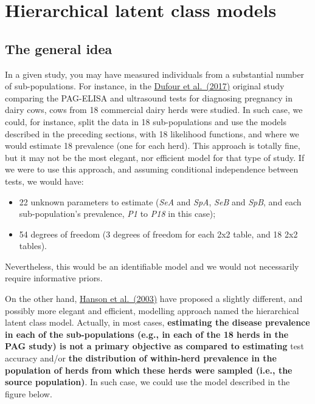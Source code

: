 \documentclass[
]{book}
\providecommand{\tightlist}{%
  \setlength{\itemsep}{0pt}\setlength{\parskip}{0pt}}
\begin{document}
\section{Hierarchical latent class models}\label{hierarchical-latent-class-models}

\subsection{The general idea}\label{the-general-idea}

In a given study, you may have measured individuals from a substantial number of sub-populations. For instance, in the \href{https://www.sciencedirect.com/science/article/pii/S016758771630527X?via\%3Dihub}{Dufour et al.~(2017)} original study comparing the PAG-ELISA and ultrasound tests for diagnosing pregnancy in dairy cows, cows from 18 commercial dairy herds were studied. In such case, we could, for instance, split the data in 18 sub-populations and use the models described in the preceding sections, with 18 likelihood functions, and where we would estimate 18 prevalence (one for each herd). This approach is totally fine, but it may not be the most elegant, nor efficient model for that type of study. If we were to use this approach, and assuming conditional independence between tests, we would have:

\begin{itemize}
\tightlist
\item
  22 unknown parameters to estimate (\emph{SeA} and \emph{SpA}, \emph{SeB} and \emph{SpB}, and each sub-population's prevalence, \emph{P1} to \emph{P18} in this case);\\
\item
  54 degrees of freedom (3 degrees of freedom for each 2x2 table, and 18 2x2 tables).
\end{itemize}

Nevertheless, this would be an identifiable model and we would not necessarily require informative priors.

On the other hand, \href{https://link.springer.com/article/10.1198/1085711031526}{Hanson et al.~(2003)} have proposed a slightly different, and possibly more elegant and efficient, modelling approach named the hierarchical latent class model. Actually, in most cases, \textbf{estimating the disease prevalence in each of the sub-populations (e.g., in each of the 18 herds in the PAG study) is not a primary objective as compared to estimating} test accuracy and/or \textbf{the distribution of within-herd prevalence in the population of herds from which these herds were sampled (i.e., the source population)}. In such case, we could use the model described in the figure below.
\end{document}

